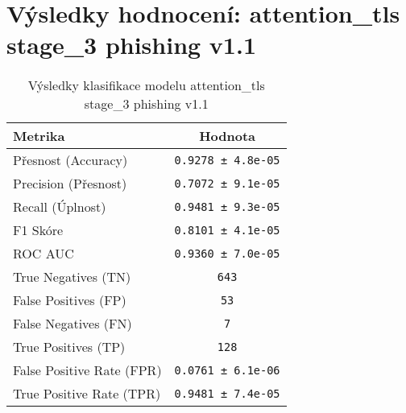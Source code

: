\section*{Výsledky hodnocení: attention_tls stage_3 phishing v1.1}
\begin{table}[h!]
\centering
\begin{tabular}{|l|c|}
\hline
\textbf{Metrika} & \textbf{Hodnota} \\
\hline
Přesnost (Accuracy) & \texttt{0.9278 ± 4.8e-05} \\
Precision (Přesnost) & \texttt{0.7072 ± 9.1e-05} \\
Recall (Úplnost) & \texttt{0.9481 ± 9.3e-05} \\
F1 Skóre & \texttt{0.8101 ± 4.1e-05} \\
ROC AUC & \texttt{0.9360 ± 7.0e-05} \\
True Negatives (TN) & \texttt{643} \\
False Positives (FP) & \texttt{53} \\
False Negatives (FN) & \texttt{7} \\
True Positives (TP) & \texttt{128} \\
False Positive Rate (FPR) & \texttt{0.0761 ± 6.1e-06} \\
True Positive Rate (TPR) & \texttt{0.9481 ± 7.4e-05} \\
\hline
\end{tabular}
\caption{Výsledky klasifikace modelu attention_tls stage_3 phishing v1.1}
\label{tab:phishing_attention_tls}
\end{table}

